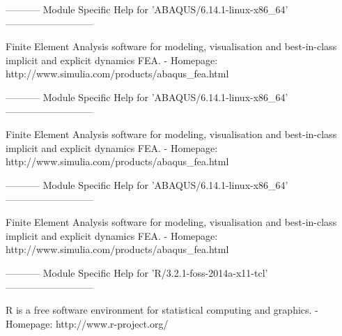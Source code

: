 \ifantwerpen
\begin{prompt}
----------- Module Specific Help for 'ABAQUS/6.14.1-linux-x86_64' ---------------------------

   Finite Element Analysis software for modeling, visualisation and best-in-class implicit and explicit dynamics FEA. - Homepage: http://www.simulia.com/products/abaqus_fea.html
\end{prompt}
\fi
\ifbrussel
\begin{prompt}
----------- Module Specific Help for 'ABAQUS/6.14.1-linux-x86_64' ---------------------------

   Finite Element Analysis software for modeling, visualisation and best-in-class implicit and explicit dynamics FEA. - Homepage: http://www.simulia.com/products/abaqus_fea.html
\end{prompt}
\fi
\ifgent
\begin{prompt}
----------- Module Specific Help for 'ABAQUS/6.14.1-linux-x86_64' ---------------------------

   Finite Element Analysis software for modeling, visualisation and best-in-class implicit and explicit dynamics FEA. - Homepage: http://www.simulia.com/products/abaqus_fea.html
\end{prompt}
\fi
\ifleuven
\begin{prompt}
----------- Module Specific Help for 'R/3.2.1-foss-2014a-x11-tcl' ---------------------------

   R is a free software environment for statistical computing and graphics. - Homepage: http://www.r-project.org/
\end{prompt}
\fi
